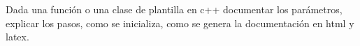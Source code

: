 Dada una función o una clase de plantilla en c++ documentar los parámetros, explicar los pasos, como se inicializa,
como se genera la documentación en html y latex.
